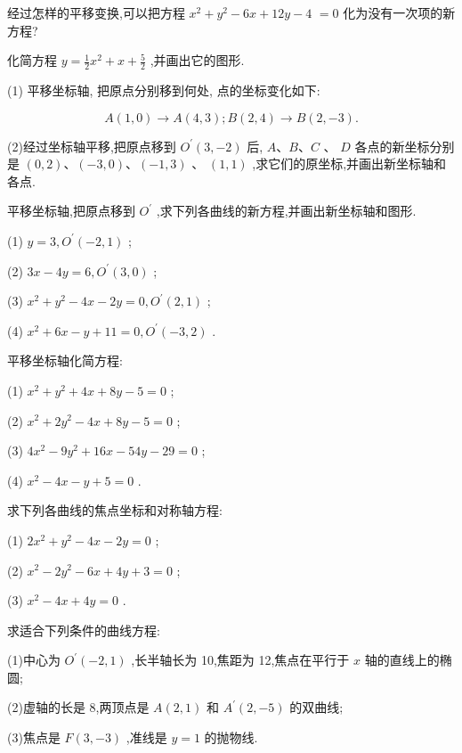 \documentclass[lang=cn,newtx,12pt,scheme=chinese]{elegantbook}
\begin{document}
\begin{problemset}[练习]

\item 经过怎样的平移变换,可以把方程 \({x}^{2} + {y}^{2} - {6x} + {12y} - 4\) \(= 0\) 化为没有一次项的新方程?

\item 化简方程 \(y = \frac{1}{2}{x}^{2} + x + \frac{5}{2}\) ,并画出它的图形.

\end{problemset}

\begin{problemset}[习 题 十]

\item (1) 平移坐标轴, 把原点分别移到何处, 点的坐标变化如下:

\[
  A\left( {1,0}\right) \rightarrow A\left( {4,3}\right) ;B\left( {2,4}\right) \rightarrow B\left( {2, - 3}\right) .
\]

(2)经过坐标轴平移,把原点移到 \({O}^{\prime }\left( {3, - 2}\right)\) 后, \(A\text{、}B\text{、}C\) 、 \(D\) 各点的新坐标分别是 \(\left( {0,2}\right) \text{、}\left( {-3,0}\right) \text{、}\left( {-1,3}\right)\) 、 \(\left( {1,1}\right)\) ,求它们的原坐标,并画出新坐标轴和各点.

\item 平移坐标轴,把原点移到 \({O}^{\prime }\) ,求下列各曲线的新方程,并画出新坐标轴和图形.

(1) \(y = 3,{O}^{\prime }\left( {-2,1}\right)\) ;

(2) \({3x} - {4y} = 6,{O}^{\prime }\left( {3,0}\right)\) ;

(3) \({x}^{2} + {y}^{2} - {4x} - {2y} = 0,{O}^{\prime }\left( {2,1}\right)\) ;

(4) \({x}^{2} + {6x} - y + {11} = 0,{O}^{\prime }\left( {-3,2}\right)\) .

\item 平移坐标轴化简方程:

(1) \({x}^{2} + {y}^{2} + {4x} + {8y} - 5 = 0\) ;

(2) \({x}^{2} + 2{y}^{2} - {4x} + {8y} - 5 = 0\) ;

(3) \(4{x}^{2} - 9{y}^{2} + {16x} - {54y} - {29} = 0\) ;

(4) \({x}^{2} - {4x} - y + 5 = 0\) .

\item 求下列各曲线的焦点坐标和对称轴方程:

(1) \(2{x}^{2} + {y}^{2} - {4x} - {2y} = 0\) ;

(2) \({x}^{2} - 2{y}^{2} - {6x} + {4y} + 3 = 0\) ;

(3) \({x}^{2} - {4x} + {4y} = 0\) .

\item 求适合下列条件的曲线方程:

(1)中心为 \({O}^{\prime }\left( {-2,1}\right)\) ,长半轴长为 10,焦距为 12,焦点在平行于 \(x\) 轴的直线上的椭圆;

(2)虚轴的长是 8,两顶点是 \(A\left( {2,1}\right)\) 和 \({A}^{\prime }\left( {2, - 5}\right)\) 的双曲线;

(3)焦点是 \(F\left( {3, - 3}\right)\) ,准线是 \(y = 1\) 的抛物线.

\end{problemset}
\end{document}

